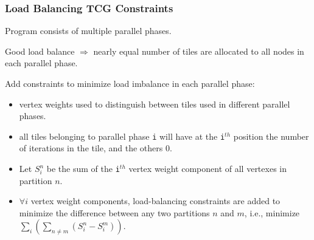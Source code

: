 \documentclass{beamer}
\begin{document}
\begin{frame}[fragile,t]
  \frametitle{Load Balancing TCG Constraints}


Program consists of multiple parallel phases.\medskip

Good load balance $\Rightarrow$ nearly equal number of tiles
are allocated to all nodes in each parallel phase.\medskip

Add constraints to minimize load imbalance in each parallel phase:
\begin{itemize}
    \item vertex weights used to distinguish between tiles used in 
            different parallel phases.
    \item all tiles belonging to parallel phase {\tt i} will
            have at the {\tt i$^{th}$} position the number of
            iterations in the tile, and the others 0.
    \item Let $S_i^n$ be the sum of the {\tt i$^{th}$} vertex 
             weight component of all vertexes in partition $n$.
    \item $\forall i$ vertex weight components, load-balancing
            constraints are added to minimize the difference
            between any two partitions $n$ and $m$, i.e., 
            minimize $\sum_i (\sum_{n\neq m}(S_i^n-S_i^m))$.
\end  {itemize}
\end{frame}
\end{document}
